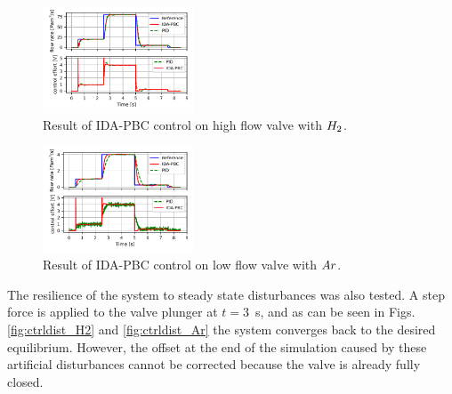 \documentclass[letterpaper, 10pt, conference]{ieeeconf}
\begin{document}
\begin{figure}[!ht]
    \centering
    \includegraphics[width=0.4\textwidth]{flow_steps_H2.pdf}
    \caption{Result of IDA-PBC control on high flow valve with \protect$H_2\protect$.}
    \label{fig:ctrlsteps_H2}
\end{figure}
\begin{figure}[!ht]
    \centering
    \includegraphics[width=0.4\textwidth]{flow_steps_Ar.pdf}
    \caption{Result of IDA-PBC control on low flow valve with \protect$Ar\protect$.}
    \label{fig:ctrlsteps_Ar}
\end{figure}


The resilience of the system to steady state disturbances was also tested. A step force is applied to the valve plunger at $t=3$~\unit{s}, and as can be seen in Figs. \ref{fig:ctrldist_H2} and \ref{fig:ctrldist_Ar} the system converges back to the desired equilibrium. However, the offset at the end of the simulation caused by these artificial disturbances cannot be corrected because the valve is already fully closed.
\end{document}
